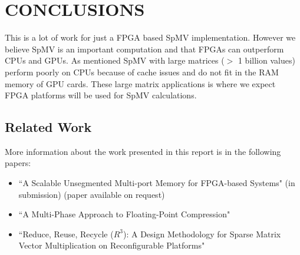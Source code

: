 \chapter{CONCLUSIONS}
\label{chp:conclusion}
This is a lot of work for just a FPGA based SpMV implementation. However we believe SpMV is an important computation and that FPGAs can outperform CPUs and GPUs. As mentioned SpMV with large matrices ($>$ 1 billion values) perform poorly on CPUs because of cache issues and do not fit in the RAM memory of GPU cards. These large matrix applications is where we expect FPGA platforms will be used for SpMV calculations.
\section{Related Work}
More information about the work presented in this report is in the following papers:
\begin{itemize}
    \item ``A Scalable Unsegmented Multi-port Memory for FPGA-based Systems" (in submission) (paper available on request)
    \item ``A Multi-Phase Approach to Floating-Point Compression" \cite{prelim:townsend3}
    \item ``Reduce, Reuse, Recycle ($R^3$): A Design Methodology for Sparse Matrix Vector Multiplication on Reconfigurable Platforms" \cite{prelim:townsend}
\end{itemize}

